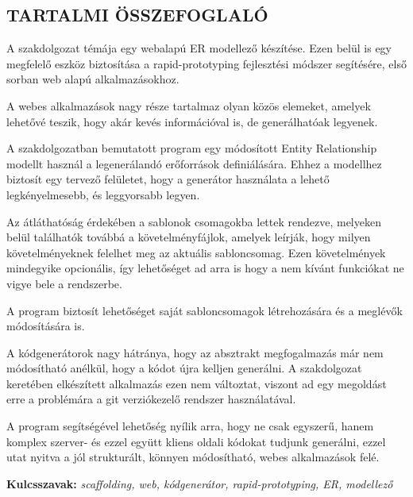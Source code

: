 \begin{center}
\section*{\textbf{\Large \MakeUppercase{\textrm{Tartalmi összefoglaló}}}}
\end{center}

\begin{justify}
A szakdolgozat témája egy webalapú ER modellező készítése. Ezen belül is egy megfelelő eszköz biztosítása a rapid-prototyping fejlesztési módszer segítésére, első sorban web alapú alkalmazásokhoz.

A webes alkalmazások nagy része tartalmaz olyan közös elemeket, amelyek lehetővé teszik, hogy akár kevés információval is, de generálhatóak legyenek.

A szakdolgozatban bemutatott program egy módosított Entity Relationship modellt használ a legenerálandó erőforrások definiálására. Ehhez a modellhez biztosít egy tervező felületet, hogy a generátor használata a lehető legkényelmesebb, és leggyorsabb legyen.

Az átláthatóság érdekében a sablonok csomagokba lettek rendezve, melyeken belül találhatók továbbá a követelményfájlok, amelyek leírják, hogy milyen követelményeknek felelhet meg az aktuális sabloncsomag. Ezen követelmények mindegyike opcionális, így lehetőséget ad arra is hogy a nem kívánt funkciókat ne vigye bele a rendszerbe.

A program  biztosít lehetőséget saját sabloncsomagok létrehozására és a meglévők módosítására is.

A kódgenerátorok nagy hátránya, hogy az absztrakt megfogalmazás már nem módosítható anélkül, hogy a kódot újra kelljen generálni. A szakdolgozat keretében elkészített alkalmazás ezen nem változtat, viszont ad egy megoldást erre a problémára a git verziókezelő rendszer használatával. 

A program segítségével lehetőség nyílik arra, hogy ne csak egyszerű, hanem komplex szerver- és ezzel együtt kliens oldali kódokat tudjunk generálni, ezzel utat nyitva a jól strukturált, könnyen módosítható, webes alkalmazások felé.
\end{justify}

\vspace{2cm}

{\bf Kulcsszavak:} {\it scaffolding, web, kódgenerátor, rapid-prototyping, ER, modellező}
